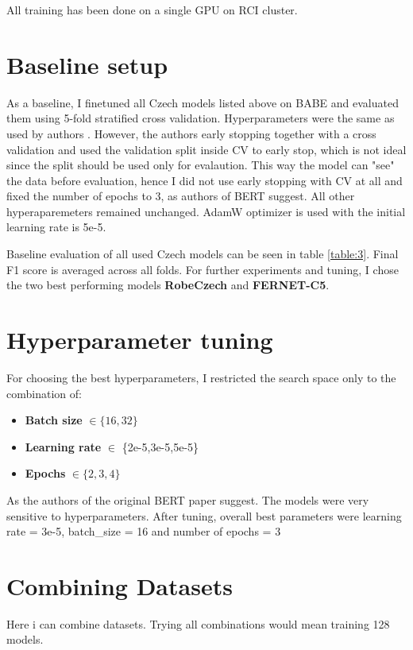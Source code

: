  
 
 
 
All training has been done on a single GPU on RCI cluster.
 \section{Baseline setup}
 As a baseline, I finetuned all Czech models listed above on BABE and evaluated them using 5-fold stratified cross validation. Hyperparameters were the same as used by authors \cite{Spinde2021MBIC}. However, the authors early stopping together with a cross validation and used the validation split inside CV to early stop, which is not ideal since the split should be used only for evalaution. This way the model can "see" the data before evaluation, hence I did not use early stopping with CV at all and fixed the number of epochs to 3, as authors of BERT \cite{devlin2019bert} suggest. 
 All other hyperaparemeters remained unchanged. AdamW optimizer is used with the initial learning rate is 5e-5. 
 
 Baseline evaluation of all used Czech models can be seen in table \ref{table:3}. Final F1 score is averaged across all folds. For further experiments and tuning, I chose the two best performing models \textbf{RobeCzech} and \textbf{FERNET-C5}.
 
 
 
 
 \section{Hyperparameter tuning}
For choosing the best hyperparameters, I restricted the search space only to the combination of:
 \begin{itemize}
     \item \textbf{Batch size} $\in \{16,32\}$
     \item \textbf{Learning rate} $\in $ \{2e-5,3e-5,5e-5\}
     \item \textbf{Epochs} $\in \{2,3,4\}$
 \end{itemize}
 
 As the authors of the original BERT paper suggest. The models were very sensitive to hyperparameters. After tuning, overall best parameters were learning rate = 3e-5, batch\_size = 16 and number of epochs = 3  
 
  

 
 
 \section{Combining Datasets}
 Here i can combine datasets. Trying all combinations would mean training 128 models.
 
